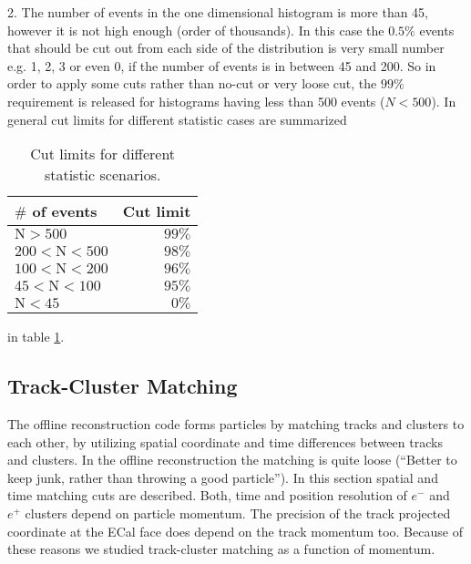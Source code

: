 \documentclass[letterpaper,12pt]{article}
\begin{document}
\vskip 1cm
2. The number of events in the one dimensional histogram is more than 45, however it is not high enough (order of thousands). In this case the $0.5\%$ events that should be cut out from each side of the distribution is very small number e.g. 1, 2, 3 or even 0, if the number of events is in between 45 and 200. So in order to apply some cuts rather than no-cut or very loose cut, the $99\%$ requirement is released for histograms having less than 500 events ($N < 500$).
In general cut limits for different statistic cases are summarized
\begin{table}[!htb]
 \centering
 \begin{tabular}{|l|r|}
  \hline
 \textbf{ $\#$ of events} & \textbf{Cut limit} \\ \hline
  $\mathrm{ N > 500}$ & $99\%$ \\ \hline
  $\mathrm{200 < N < 500}$ & $98\%$ \\ \hline
  $\mathrm{100 < N < 200}$ & $96\%$ \\ \hline
  $\mathrm{45 < N < 100}$ & $95\%$ \\ \hline
  $\mathrm{N < 45}$ & $0\%$ \\ \hline
 \end{tabular}
\caption{Cut limits for different statistic scenarios.}
\label{tb:2DCutLimits}
\end{table}
in table \ref{tb:2DCutLimits}.

\subsection{Track-Cluster Matching}
The offline reconstruction code forms particles by matching tracks and clusters to each other, by utilizing spatial coordinate and time differences between tracks and clusters.
In the offline reconstruction the matching is quite loose (``Better to keep junk, rather than throwing a good particle''). In this section spatial and time matching cuts are described. Both, time and position resolution of $e^{-}$ and $e^{+}$ clusters depend on particle momentum. The precision of the track projected coordinate at the ECal face does depend on the track momentum too. Because of these reasons we studied track-cluster matching as a function of momentum.
\end{document}
